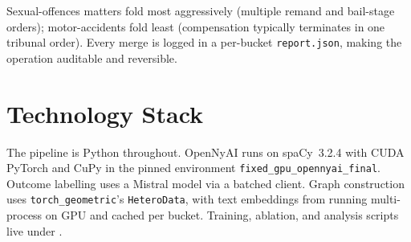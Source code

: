 Sexual-offences matters fold most aggressively (multiple remand and bail-stage orders); motor-accidents fold least (compensation typically terminates in one tribunal order). Every merge is logged in a per-bucket \texttt{report.json}, making the operation auditable and reversible.

\section{Technology Stack}

The pipeline is Python throughout. OpenNyAI runs on spaCy~3.2.4 with CUDA PyTorch and CuPy in the pinned environment \texttt{fixed\_gpu\_opennyai\_final}. Outcome labelling uses a Mistral model via a batched client. Graph construction uses \texttt{torch\_geometric}'s \texttt{HeteroData}, with text embeddings from  running multi-process on GPU and cached per bucket. Training, ablation, and analysis scripts live under .
